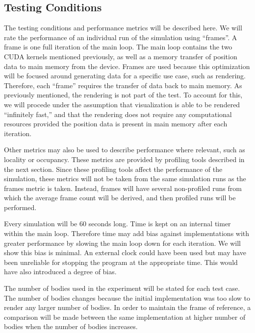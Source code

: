 \documentclass[10pt]{IEEEtran}
\newcommand{\?}{\stackrel{?}{=}}
\begin{document}
\subsection{Testing Conditions}
The testing conditions and performance metrics will be described here. We will
rate the performance of an individual run of the simulation using ``frames''. 
A frame is one full iteration of the main loop. The main loop contains the two
CUDA kernels mentioned previously, as well as a memory transfer of position 
data to main memory from the device. Frames are used because this optimization
will be focused around generating data for a specific use case, such as rendering.
Therefore, each ``frame'' requires the transfer of data back to main memory. As
previously mentioned, the rendering is not part of the test. To account for this,
we will procede under the assumption that visualization is able to be rendered
``infinitely fast,'' and that the rendering does not require any computational
resources provided the position data is present in main memory after each 
iteration.

Other metrics may also be used to describe performance where relevant, such as 
locality or occupancy. These metrics are provided by profiling tools described
in the next section. Since these profiling tools affect the performance of 
the simulation, these metrics will not be taken from the same simulation runs
as the frames metric is taken. Instead, frames will have several non-profiled 
runs from which the average frame count will be derived, and then profiled runs
 will be performed.

Every simulation will be $60$ seconds long. Time is kept on an 
internal timer within the main loop. Therefore time may add bias against implementations
with greater performance by slowing the main loop down for each iteration. We will
show this bias is minimal. An external clock could have been used but may have
been unreliable for stopping the program at the appropriate time. This would
have also introduced a degree of bias.

The number of bodies used in the experiment will be stated for each test case. 
The number of bodies changes because the initial implementation was too slow to
render any larger number of bodies. In order to maintain the frame of 
reference, a comparison will be made between the same implementation at higher
number of bodies when the number of bodies increases. 
\end{document}
